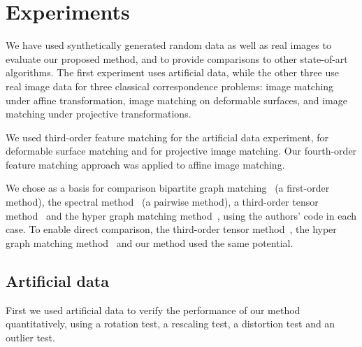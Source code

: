 \section{Experiments}
\label{sec:experiments}

We have used synthetically generated random data as well as real images to evaluate our proposed method, and to provide comparisons to other state-of-art algorithms. The first experiment uses artificial data, while the other three use real image data for three classical correspondence problems: image matching under affine transformation, image matching on deformable surfaces, and image matching under projective transformations.

We used third-order feature matching for the artificial data experiment, for deformable surface matching and for projective image matching. Our fourth-order feature matching approach was applied to affine image matching.

We chose as a basis for comparison bipartite graph matching~\cite{Belongie02} (a first-order method), the spectral method~\cite{Cour06} (a pairwise method), a third-order tensor method~\cite{Duchenne_etal09} and the hyper graph matching method~\cite{Zass08}, using the authors' code in each case.
To enable direct comparison, the third-order tensor method~\cite{Duchenne_etal09}, the hyper graph matching method~\cite{Zass08} and our method used the same potential.

\subsection{Artificial data}
\label{subsec:artificialdata}

First we used artificial data to verify the performance of our method quantitatively, using a rotation test, a rescaling test, a distortion test and an outlier test.

